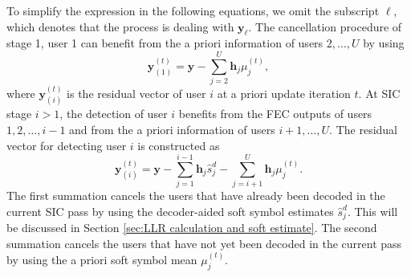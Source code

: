 To simplify the expression in the following equations, we omit the subscript $\ell$, which denotes that the process is dealing with $\bm{y}_{\ell}$. The cancellation procedure of stage 1, user 1 can benefit from the a priori information of users $2,\ldots,U$ by using
\begin{equation}
    \label{eq:idd-stage-one-residual}
    \bm{y}_{(1)}^{(t)}
    =
    \bm{y}
    -
    \sum_{j=2}^{U}
    \bm{h}_{j}\mu^{(t)}_{j},
\end{equation}
where $\bm{y}_{(i)}^{(t)}$ is the residual vector of user $i$ at a priori update iteration $t$.
At SIC stage $i>1$, the detection of user $i$ benefits from the FEC outputs of users $1,2,\ldots,i-1$ and from the a priori information of users $i+1,\ldots,U$. The residual vector for detecting user $i$ is constructed as
\begin{equation}
    \label{eq:idd-stage-i-residual}
    \bm{y}_{(i)}^{(t)}
    =
    \bm{y}
    -
    \sum_{j=1}^{i-1}
    \bm{h}_{j}\hat{s}^{d}_{j}
    -
    \sum_{j=i+1}^{U}
    \bm{h}_{j}\mu^{(t)}_{j}.
\end{equation}
The first summation cancels the users that have already been decoded in the current SIC pass by using the decoder-aided soft symbol estimates $\hat{s}^{d}_{j}$. 
This will be discussed in Section \ref{sec:LLR calculation and soft estimate}. 
The second summation cancels the users that have not yet been decoded in the current pass by using the a priori soft symbol mean $\mu^{(t)}_{j}$.

